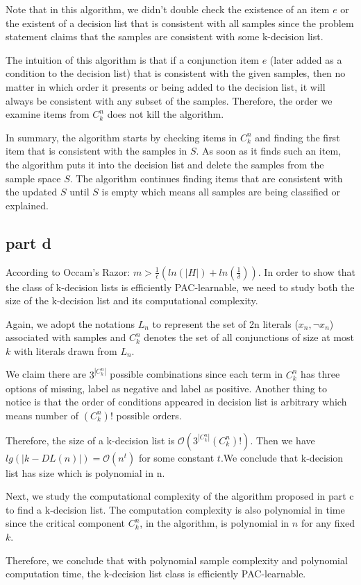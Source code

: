 Note that in this algorithm, we didn't double check the existence of an item $e$ or the existent of a decision list that is consistent with all samples since the problem statement claims that the samples are consistent with some k-decision list.

The intuition of this algorithm is that if a conjunction item $e$ (later added as a condition to the decision list) that is consistent with the given samples, then no matter in which order it presents or being added to the decision list, it will always be consistent with any subset of the samples. Therefore, the order we examine items from $C_k^n$ does not kill the algorithm.

In summary, the algorithm starts by checking items in $C_k^n$ and finding the first item that is consistent with the samples in $S$. As soon as it finds such an item, the algorithm puts it into the decision list and delete the samples from the sample space $S$. The algorithm continues finding items that are consistent with the updated $S$ until $S$ is empty which means all samples are being classified or explained.

\subsection{part d}

According to Occam's Razor: $m>\frac{1}{\epsilon}(ln(|H|)+ln(\frac{1}{\delta}))$. In order to show that the class of k-decision lists is efficiently PAC-learnable, we need to study both the size of the k-decision list and its computational complexity.

Again, we adopt the notations $L_n$ to represent the set of 2n literals ($x_n, \neg{x_n}$) associated with samples and $C_k^n$ denotes the set of all conjunctions of size at most $k$ with literals drawn from $L_n$.

We claim there are $3^{|C_k^n|}$ possible combinations since each term in $C_k^n$ has three options of missing, label as negative and label as positive. Another thing to notice is that the order of conditions appeared in decision list is arbitrary which means number of $(C_k^n)!$ possible orders.

Therefore, the size of a k-decision list is $\mathcal{O}(3^{|C_k^n|}(C_k^n)!)$. Then we have $lg(|k-DL(n)|) = \mathcal{O}(n^t)$ for some constant $t$.We conclude that k-decision list has size which is polynomial in n.

Next, we study the computational complexity of the algorithm proposed in part c to find a k-decision list. The computation complexity is also polynomial in time since the critical component $C_k^n$, in the algorithm, is polynomial in $n$ for any fixed $k$.

Therefore, we conclude that with polynomial sample complexity and polynomial computation time, the k-decision list class is efficiently PAC-learnable.










